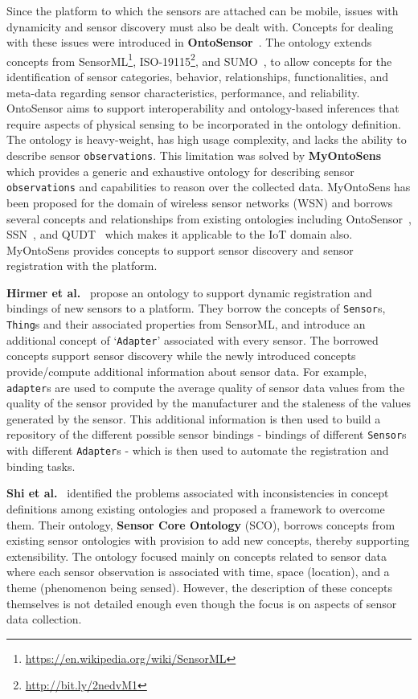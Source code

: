 \documentclass{elsart}  %
\begin{document}
Since the platform to which the sensors are attached can be mobile, issues with dynamicity and sensor discovery must also be dealt with. Concepts for dealing with these issues were introduced in \textbf{OntoSensor}~\cite{ontosensor}. The ontology extends concepts from SensorML\footnote{\url{https://en.wikipedia.org/wiki/SensorML}}, ISO-19115\footnote{\url{http://bit.ly/2nedvM1}}, and SUMO~\cite{niles2001towards}, to allow concepts for the identification of sensor categories, behavior, relationships, functionalities, and meta-data regarding sensor characteristics, performance, and reliability. OntoSensor aims to support interoperability and ontology-based inferences that require aspects of physical sensing to be incorporated in the ontology definition. The ontology is heavy-weight, has high usage complexity, and lacks the ability to describe sensor \texttt{observations}. This limitation was solved by \textbf{MyOntoSens}~\cite{nachabe2015unified} which provides a generic and exhaustive ontology for describing sensor \texttt{observations} and capabilities to reason over the collected data. MyOntoSens has been proposed for the domain of wireless sensor networks (WSN) and borrows several concepts and relationships from existing ontologies including OntoSensor~\cite{ontosensor}, SSN~\cite{ssn2012}, and QUDT~\cite{hodgson2014qudt} which makes it applicable to the IoT domain also. MyOntoSens provides concepts to support sensor discovery and sensor registration with the platform.

\textbf{Hirmer et al.}~\cite{Hirmer2016} propose an ontology to support dynamic registration and bindings of new sensors to a platform. They borrow the concepts of \texttt{Sensor}s, \texttt{Thing}s and their associated properties from SensorML, and introduce an additional concept of `\texttt{Adapter}' associated with every sensor. The borrowed concepts support sensor discovery while the newly introduced concepts provide/compute additional information about sensor data. For example, \texttt{adapter}s are used to compute the average quality of sensor data values from the quality of the sensor provided by the manufacturer and the staleness of the values generated by the sensor. This additional information is then used to build a repository of the different possible sensor bindings - bindings of different \texttt{Sensor}s with different \texttt{Adapter}s - which is then used to automate the registration and binding tasks. 

\textbf{Shi et al.}~\cite{shi2012sensor} identified the problems associated with inconsistencies in concept definitions among existing ontologies and proposed a framework to overcome them. Their ontology, \textbf{Sensor Core Ontology} (SCO), borrows concepts from existing sensor ontologies with provision to add new concepts, thereby supporting extensibility. The ontology focused mainly on concepts related to sensor data where each sensor observation is associated with time, space (location), and a theme (phenomenon being sensed). However, the description of these concepts themselves is not detailed enough even though the focus is on aspects of sensor data collection. 
\end{document}
